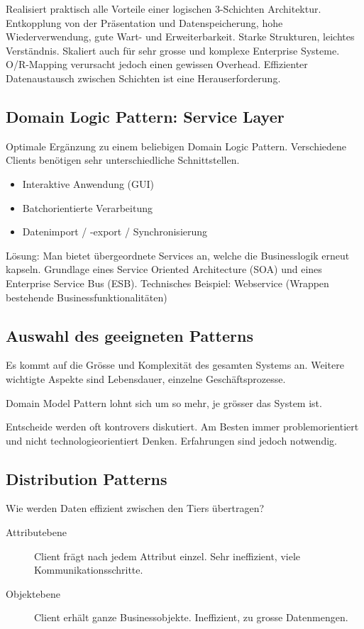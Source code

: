 Realisiert praktisch alle Vorteile einer logischen 3-Schichten Architektur. Entkopplung von der Präsentation und Datenspeicherung, hohe Wiederverwendung, gute Wart- und Erweiterbarkeit. Starke Strukturen, leichtes Verständnis. Skaliert auch für sehr grosse und komplexe Enterprise Systeme.
O/R-Mapping verursacht jedoch einen gewissen Overhead. Effizienter Datenaustausch zwischen Schichten ist eine Herauserforderung.

\subsection{Domain Logic Pattern: Service Layer}
Optimale Ergänzung zu einem beliebigen Domain Logic Pattern. Verschiedene Clients benötigen sehr unterschiedliche Schnittstellen.

\begin{itemize}
	\item Interaktive Anwendung (GUI)
	\item Batchorientierte Verarbeitung
	\item Datenimport / -export / Synchronisierung
\end{itemize}

Lösung: Man bietet übergeordnete Services an, welche die Businesslogik erneut kapseln. Grundlage eines Service Oriented Architecture (SOA) und eines Enterprise Service Bus (ESB). Technisches Beispiel: Webservice (Wrappen bestehende Businessfunktionalitäten)

\subsection{Auswahl des geeigneten Patterns}
Es kommt auf die Grösse und Komplexität des gesamten Systems an. Weitere wichtigte Aspekte sind Lebensdauer, einzelne Geschäftsprozesse.

Domain Model Pattern lohnt sich um so mehr, je grösser das System ist.

Entscheide werden oft kontrovers diskutiert. Am Besten immer problemorientiert und nicht technologieorientiert Denken. Erfahrungen sind jedoch notwendig.

\subsection{Distribution Patterns}
Wie werden Daten effizient zwischen den Tiers übertragen?

\begin{description}
	\item[Attributebene] Client frägt nach jedem Attribut einzel. Sehr ineffizient, viele Kommunikationsschritte.
	\item[Objektebene] Client erhält ganze Businessobjekte. Ineffizient, zu grosse Datenmengen.
\end{description}

